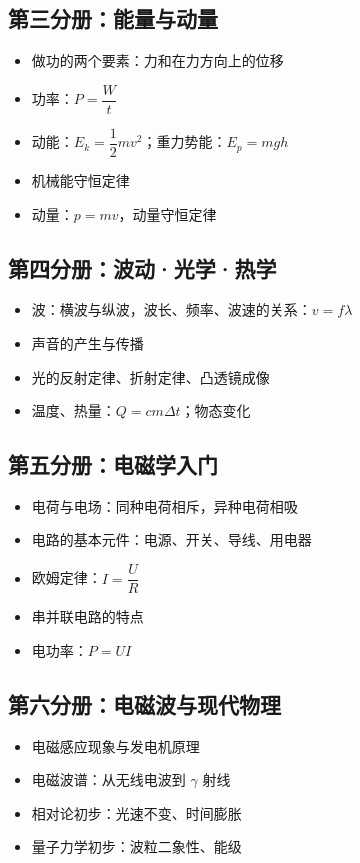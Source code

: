 \documentclass[a4paper,12pt]{ctexart}
\begin{document}
\subsection*{\textcolor{thinkorange}{第三分册：能量与动量}}
\begin{itemize}
  \item 做功的两个要素：力和在力方向上的位移
  \item 功率：$P = \dfrac{W}{t}$
  \item 动能：$E_k = \dfrac12 mv^2$；重力势能：$E_p = mgh$
  \item 机械能守恒定律
  \item 动量：$p = mv$，动量守恒定律
\end{itemize}

\subsection*{\textcolor{thinkorange}{第四分册：波动·光学·热学}}
\begin{itemize}
  \item 波：横波与纵波，波长、频率、波速的关系：$v = f\lambda$
  \item 声音的产生与传播
  \item 光的反射定律、折射定律、凸透镜成像
  \item 温度、热量：$Q = cm\Delta t$；物态变化
\end{itemize}

\subsection*{\textcolor{thinkorange}{第五分册：电磁学入门}}
\begin{itemize}
  \item 电荷与电场：同种电荷相斥，异种电荷相吸
  \item 电路的基本元件：电源、开关、导线、用电器
  \item 欧姆定律：$I = \dfrac{U}{R}$
  \item 串并联电路的特点
  \item 电功率：$P = UI$
\end{itemize}

\subsection*{\textcolor{thinkorange}{第六分册：电磁波与现代物理}}
\begin{itemize}
  \item 电磁感应现象与发电机原理
  \item 电磁波谱：从无线电波到 $\gamma$ 射线
  \item 相对论初步：光速不变、时间膨胀
  \item 量子力学初步：波粒二象性、能级
\end{itemize}
\end{document}
